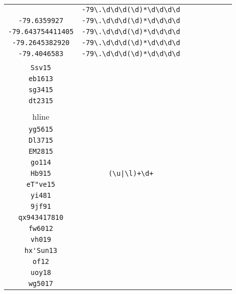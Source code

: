 \begin{longtable}{cccccccc}
\begin{tabular}{ll}
    \verb|-79.5677699| & \verb|-79\.\d\d\d(\d)*\d\d\d\d|\\
\verb|-79.6359927| & \verb|-79\.\d\d\d(\d)*\d\d\d\d|\\
\verb|-79.643754411405| & \verb|-79\.\d\d\d(\d)*\d\d\d\d|\\
\verb|-79.2645382920| & \verb|-79\.\d\d\d(\d)*\d\d\d\d|\\
\verb|-79.4046583| & \verb|-79\.\d\d\d(\d)*\d\d\d\d|
\end{tabular}
\\\midrule 
\begin{tabular}{l}
    \verb|als15|\\
\verb|Ssv15|\\
\verb|eb1613|\\
\verb|sg3415|\\
\verb|dt2315|\\
\\hline\\
\verb|yg5615|\\
\verb|Dl3715|\\
\verb|EM2815|\\
\verb|go114|\\
\verb|Hb915|
\end{tabular}

&
\verb.(\u|\l)+\d+.
&

\begin{tabular}{l}
    \verb|(.)*\l\l(\d)*1(\d)*|\\
\verb|eT"ve15|\\
\verb|yi481|\\
\verb|9jf91|\\
\verb|qx943417810|\\
\verb|fw6012|
\end{tabular}

&

\begin{tabular}{l}
    \verb|(.)*\l\l(\d)*1\d|\\
\verb|vh019|\\
\verb|hx'Sun13|\\
\verb|of12|\\
\verb|uoy18|\\
\verb|wg5017|
\end{tabular}

&


\end{longtable}
